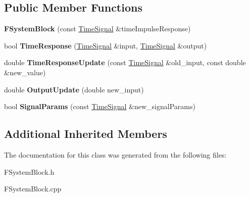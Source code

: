 \subsection*{Public Member Functions}
\begin{DoxyCompactItemize}
\item 
\mbox{\label{classFSystemBlock_afeefa2c3dad2736a3a43b132d1a7954f}} 
{\bfseries F\+System\+Block} (const \hyperlink{classTimeSignal}{Time\+Signal} \&time\+Impulse\+Response)
\item 
\mbox{\label{classFSystemBlock_aa5bcc98b35e5949b49c7be29a8fdd9bc}} 
bool {\bfseries Time\+Response} (\hyperlink{classTimeSignal}{Time\+Signal} \&input, \hyperlink{classTimeSignal}{Time\+Signal} \&output)
\item 
\mbox{\label{classFSystemBlock_a177247b4cfeb76fe43261f28460a4dba}} 
double {\bfseries Time\+Response\+Update} (const \hyperlink{classTimeSignal}{Time\+Signal} \&old\+\_\+input, const double \&new\+\_\+value)
\item 
\mbox{\label{classFSystemBlock_a5462deb7ce710d22bd604bc9e7930b8e}} 
double {\bfseries Output\+Update} (double new\+\_\+input)
\item 
\mbox{\label{classFSystemBlock_a726c5fb11e9429c4fd426b4e49685ada}} 
bool {\bfseries Signal\+Params} (const \hyperlink{classTimeSignal}{Time\+Signal} \&new\+\_\+signal\+Params)
\end{DoxyCompactItemize}
\subsection*{Additional Inherited Members}


The documentation for this class was generated from the following files\+:\begin{DoxyCompactItemize}
\item 
F\+System\+Block.\+h\item 
F\+System\+Block.\+cpp\end{DoxyCompactItemize}
